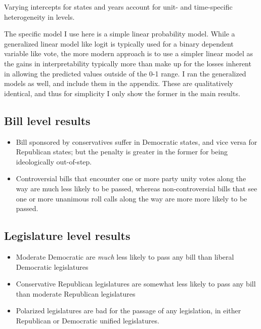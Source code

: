 \documentclass[
  oneside]{book}
\providecommand{\tightlist}{%
  \setlength{\itemsep}{0pt}\setlength{\parskip}{0pt}}
\begin{document}
Varying intercepts for states and years account for unit- and time-specific heterogeneity in levels.

The specific model I use here is a simple linear probability model. While a generalized linear model like logit is typically used for a binary dependent variable like vote, the more modern approach is to use a simpler linear model as the gains in interpretability typically more than make up for the losses inherent in allowing the predicted values outside of the 0-1 range. I ran the generalized models as well, and include them in the appendix. These are qualitatively identical, and thus for simplicity I only show the former in the main results.

\hypertarget{bill-level-results}{%
\subsection{Bill level results}\label{bill-level-results}}

\begin{itemize}
\tightlist
\item
  Bill sponsored by conservatives suffer in Democratic states, and vice versa for Republican states; but the penalty is greater in the former for being ideologically out-of-step.
\item
  Controversial bills that encounter one or more party unity votes along the way are much less likely to be passed, whereas non-controversial bills that see one or more unanimous roll calls along the way are more more likely to be passed.
\end{itemize}

\hypertarget{legislature-level-results}{%
\subsection{Legislature level results}\label{legislature-level-results}}

\begin{itemize}
\tightlist
\item
  Moderate Democratic are \emph{much} less likely to pass any bill than liberal Democratic legislatures
\item
  Conservative Republican legislatures are somewhat less likely to pass any bill than moderate Republican legislatures
\item
  Polarized legislatures are bad for the passage of any legislation, in either Republican or Democratic unified legislatures.
\end{itemize}
\end{document}
